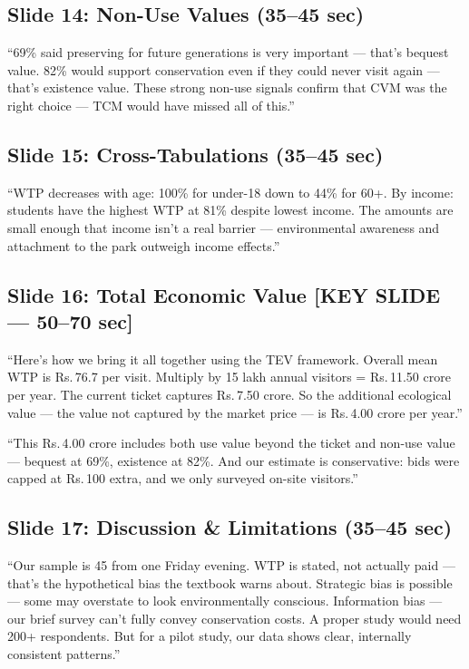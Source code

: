 \documentclass[11pt, a4paper]{article}
\newcommand{\rupee}{Rs.\,}
\newenvironment{ansbox}{%
    \def\FrameCommand{\textcolor{darkgreen}{\vrule width 2pt}\hspace{8pt}}%
    \MakeFramed{\advance\hsize-\width\FrameRestore}%
}{%
    \endMakeFramed%
}
\begin{document}
\subsection{Slide 14: Non-Use Values \normalfont\small(35--45 sec)}
\begin{ansbox}
``69\% said preserving for future generations is very important --- that's bequest value. 82\% would support conservation even if they could never visit again --- that's existence value. These strong non-use signals confirm that CVM was the right choice --- TCM would have missed all of this.''
\end{ansbox}

\subsection{Slide 15: Cross-Tabulations \normalfont\small(35--45 sec)}
\begin{ansbox}
``WTP decreases with age: 100\% for under-18 down to 44\% for 60+. By income: students have the highest WTP at 81\% despite lowest income. The amounts are small enough that income isn't a real barrier --- environmental awareness and attachment to the park outweigh income effects.''
\end{ansbox}

\subsection{Slide 16: Total Economic Value \normalfont\small\textcolor{alertred}{[KEY SLIDE --- 50--70 sec]}}
\begin{ansbox}
``Here's how we bring it all together using the TEV framework. Overall mean WTP is \rupee 76.7 per visit. Multiply by 15 lakh annual visitors = \rupee 11.50 crore per year. The current ticket captures \rupee 7.50 crore. So the additional ecological value --- the value not captured by the market price --- is \rupee 4.00 crore per year.''

``This \rupee 4.00 crore includes both use value beyond the ticket and non-use value --- bequest at 69\%, existence at 82\%. And our estimate is conservative: bids were capped at \rupee 100 extra, and we only surveyed on-site visitors.''
\end{ansbox}

\subsection{Slide 17: Discussion \& Limitations \normalfont\small(35--45 sec)}
\begin{ansbox}
``Our sample is 45 from one Friday evening. WTP is stated, not actually paid --- that's the hypothetical bias the textbook warns about. Strategic bias is possible --- some may overstate to look environmentally conscious. Information bias --- our brief survey can't fully convey conservation costs. A proper study would need 200+ respondents. But for a pilot study, our data shows clear, internally consistent patterns.''
\end{ansbox}
\end{document}
